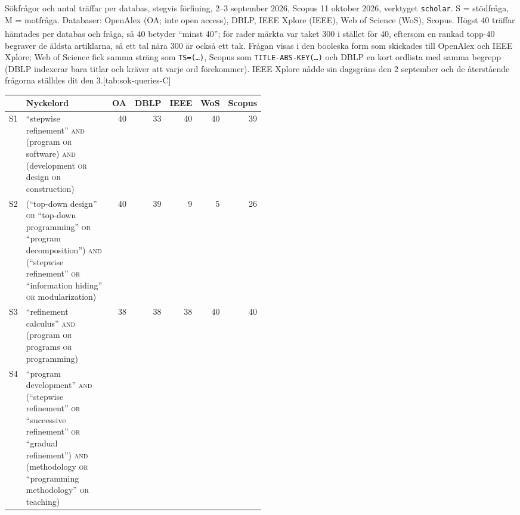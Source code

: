\begin{table}[htbp]
  \begin{sidecaption}{Sökfrågor och antal träffar per databas, stegvis förfining,
    2--3 september 2026, Scopus 11 oktober 2026, verktyget \texttt{scholar}.  S = stödfråga, M = motfråga.
    Databaser: OpenAlex (OA; inte \foreignlanguage{english}{open access}),
    DBLP, IEEE Xplore (IEEE), Web of Science (WoS), Scopus.  Högst 40
    träffar hämtades per databas och fråga, så 40 betyder \enquote{minst
    40}; för rader märkta \textsuperscript{\dag} var taket 300 i stället för 40, eftersom en rankad topp-40 begraver de äldsta artiklarna, så ett tal nära 300 är också ett tak.  Frågan visas i den booleska form som skickades till OpenAlex
    och IEEE Xplore; Web of Science fick samma sträng som
    \texttt{TS=(\dots)}, Scopus som \texttt{TITLE-ABS-KEY(\dots)} och DBLP
    en kort ordlista med samma begrepp (DBLP indexerar bara titlar och
    kräver att varje ord förekommer).  IEEE Xplore nådde sin
    dagsgräns den 2 september och de återstående frågorna ställdes dit
    den 3.}[tab:sok-queries-C]
    \centering\footnotesize
    \begin{tabular}{@{}lp{0.5\linewidth}rrrrr@{}}
      \toprule
      & Nyckelord & OA & DBLP & IEEE & WoS & Scopus \\
      \midrule
      S1 & \enquote{stepwise refinement} \textsc{and} (program \textsc{or} software) \textsc{and} (development \textsc{or} design \textsc{or} construction)
         & 40 & 33 & 40 & 40 & 39 \\
      S2 & (\enquote{top-down design} \textsc{or} \enquote{top-down programming} \textsc{or} \enquote{program decomposition}) \textsc{and} (\enquote{stepwise refinement} \textsc{or} \enquote{information hiding} \textsc{or} modularization)
         & 40 & 39 & 9 & 5 & 26 \\
      S3 & \enquote{refinement calculus} \textsc{and} (program \textsc{or} programs \textsc{or} programming)
         & 38 & 38 & 38 & 40 & 40 \\
      S4 & \enquote{program development} \textsc{and} (\enquote{stepwise refinement} \textsc{or} \enquote{successive refinement} \textsc{or} \enquote{gradual refinement}) \textsc{and} (methodology \textsc{or} \enquote{programming methodology} \textsc{or} teaching)

\end{tabular}
\end{sidecaption}
\end{table}
